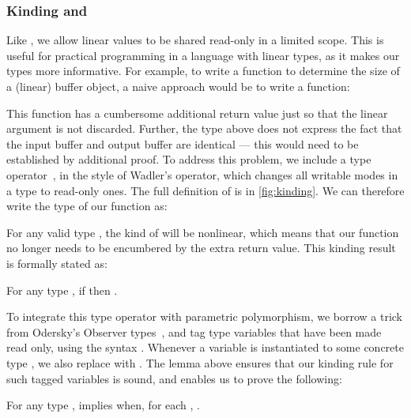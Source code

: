 \documentclass[9pt\ifFinal\else,preprint,nocopyrightspace\fi,\ifAlpha\else natbib,authoryear\fi]{sigplanconf}
\begin{document}
\subsubsection{Kinding and }
\label{sec:kindletb}

Like \citet{Wadler_90}, we allow linear values to be shared read-only in a limited scope. This is useful for practical programming
in a language with linear types, as it makes our types more informative. For example, to write a function to determine the size of a (linear) buffer object, 
a naive approach would be to write a function:

This function has a cumbersome additional return value just so that the linear
argument is not discarded. Further, the type above does not express the fact that the
input buffer and output buffer are identical --- this would need to be established by additional proof.  To address this problem, we include a type operator~, in the style
of Wadler's  operator, which changes all writable modes in a type to read-only ones. The full definition of  is in \autoref{fig:kinding}.
We can therefore write the type of our function as:

For any valid type , the kind of  will be
nonlinear, which means that our  function no longer needs to be encumbered by the 
extra return value. This kinding result is formally stated as:

\begin{lemma} For any type , if  then .
\end{lemma}

\noindent To integrate this type operator with parametric polymorphism, we borrow a trick from Odersky's Observer types~\citep{Odersky_92}, and tag type variables that
have been made read only, using the syntax . Whenever a variable  is instantiated to some concrete type , we also replace 
 with . The lemma above ensures that our kinding rule for such tagged variables is sound, and enables us to prove the following:

\begin{lemma} For any type , 
      implies  when, for each , .
\end{lemma}
\end{document}
